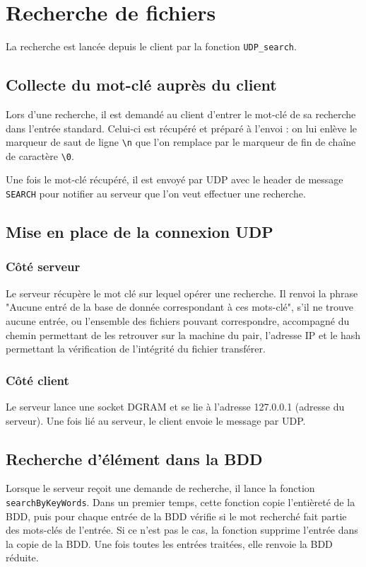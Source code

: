 \section{Recherche de fichiers}

La recherche est lancée depuis le client par la fonction \verb|UDP_search|.

\subsection{Collecte du mot-clé auprès du client}
Lors d'une recherche, il est demandé au client d'entrer le mot-clé de sa recherche dans l'entrée standard. Celui-ci est récupéré et préparé à l'envoi : on lui enlève le marqueur de saut de ligne \verb|\n| que l'on remplace par le marqueur de fin de chaîne de caractère \verb|\0|.
\vskip 0.25cm

Une fois le mot-clé récupéré, il est envoyé par UDP avec le header de message \verb|SEARCH| pour notifier au serveur que l'on veut effectuer une recherche.

\subsection{Mise en place de la connexion UDP}
\subsubsection{Côté serveur}

Le serveur récupère le mot clé sur lequel opérer une recherche. Il renvoi la phrase "Aucune entré de la base de donnée correspondant à ces mots-clé", s'il ne trouve aucune entrée, ou l'ensemble des fichiers pouvant correspondre, accompagné du chemin permettant de les retrouver sur la machine du pair, l'adresse IP et le hash permettant la vérification de l'intégrité du fichier transférer.


\subsubsection{Côté client}
Le serveur lance une socket DGRAM et se lie à l'adresse 127.0.0.1 (adresse du serveur). Une fois lié au serveur, le client envoie le message par UDP.


\subsection{Recherche d'élément dans la BDD}

Lorsque le serveur reçoit une demande de recherche, il lance la fonction \verb|searchByKeyWords|. Dans un premier temps, cette fonction copie l'entièreté de la BDD, puis pour chaque entrée de la BDD vérifie si le mot recherché fait partie des mots-clés de l'entrée. Si ce n'est pas le cas, la fonction supprime l'entrée dans la copie de la BDD. Une fois toutes les entrées traitées, elle renvoie la BDD réduite.
\vskip 0.25cm

